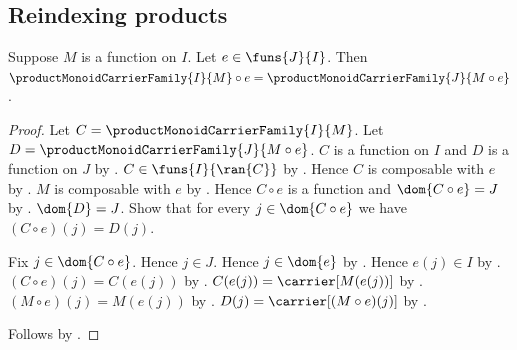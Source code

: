 \subsection{Reindexing products}

\begin{proposition}\label{product_monoid_carrier_family_reindex}
    Suppose $M$ is a function on $I$.
    Let $e\in\funs{J}{I}$.
    Then
        $\productMonoidCarrierFamily{I}{M}\circ e
            =\productMonoidCarrierFamily{J}{M\circ e}$.
\end{proposition}
\begin{proof}
    Let $C=\productMonoidCarrierFamily{I}{M}$.
    Let $D=\productMonoidCarrierFamily{J}{M\circ e}$.
    $C$ is a function on $I$ and $D$ is a function on $J$ by
        .
    $C\in\funs{I}{\ran{C}}$ by
        .
    Hence $C$ is composable with $e$ by
        .
    $M$ is composable with $e$ by .
    Hence $C\circ e$ is a function and $\dom{C\circ e}=J$ by
        .
    $\dom{D}=J$.
    Show that for every $j\in\dom{C\circ e}$ we have
        $(C\circ e)(j)=D(j)$.
    \begin{subproof}
        Fix $j\in\dom{C\circ e}$.
        Hence $j\in J$.
        Hence $j\in\dom{e}$ by .
        Hence $e(j)\in I$ by .
        $(C\circ e)(j)=C(e(j))$ by
            .
        $C(e(j))=\carrier[M(e(j))]$ by
            .
        $(M\circ e)(j)=M(e(j))$ by
            .
        $D(j)=\carrier[(M\circ e)(j)]$ by
            .
    \end{subproof}
    Follows by .
\end{proof}

